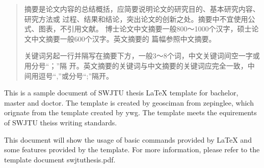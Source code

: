 
\begin{abstract}

  摘要是论文内容的总结概括，应简要说明论文的研究目的、基本研究内容、 研究方法或
  过程、结果和结论，突出论文的创新之处。摘要中不宜使用公式、图表，不引用文献。
  博士论文中文摘要一般800～1000个汉字，硕士论文中文摘要一般600个汉字。英文摘要的
  篇幅参照中文摘要。

  关键词另起一行并隔写在摘要下方，一般3～8个词，中文关键词间空一字或用分号“；”隔
  开。英文摘要的关键词与中文摘要的关键词应完全一致，中间用逗号“,”或分号“;”隔开。
  \vspace{2\baselineskip}
\end{abstract}

\begin{enabstract}
  This is a sample document of SWJTU thesis \LaTeX{} template for bachelor,
  master and doctor. The template is created by geosciman from zepinglee, which
  orignate from the template created by ywg. The template meets the
  equirements of SWJTU theiss writing standards.

  This document will show the usage of basic commands provided by \LaTeX{} and
  some features provided by the template. For more information, please refer to
  the template document swjtuthesis.pdf.

  \vspace{2\baselineskip}
\end{enabstract}
